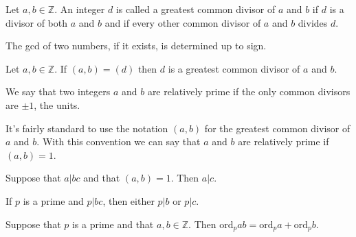 \documentclass{mynotes}
\begin{document}
\begin{definition}
Let $a,b\in\mathbb{Z}$. An integer $d$ is called a greatest common divisor of $a$ and $b$ if $d$ is a divisor of both $a$ and $b$ and if every other common divisor of $a$ and $b$ divides $d$.
\end{definition}
\begin{remark}
The gcd of two numbers, if it exists, is determined up to sign.
\end{remark}
\begin{lemma}
Let $a,b\in\mathbb{Z}$. If $(a,b) = (d)$ then $d$ is a greatest common divisor of $a$ and $b$.
\end{lemma}
\begin{definition}
We say that two integers $a$ and $b$ are relatively prime if the only common divisors are $\pm1$, the units.
\end{definition}
It's fairly standard to use the notation $(a, b)$ for the greatest common divisor of $a$ and $b$. With this convention we can say that $a$ and $b$ are relatively prime if $(a,b)=1$.
\begin{proposition}
Suppose that $a|bc$ and that $(a,b)=1$. Then $a|c$.
\end{proposition}
\begin{corollary}
If $p$ is a prime and $p|bc$, then either $p|b$ or $p|c$.
\end{corollary}
\begin{corollary}
Suppose that $p$ is a prime and that $a,b\in\mathbb{Z}$. Then $\mbox{ord}_pab=\mbox{ord}_pa+\mbox{ord}_pb.$
\end{corollary}
\end{document}

